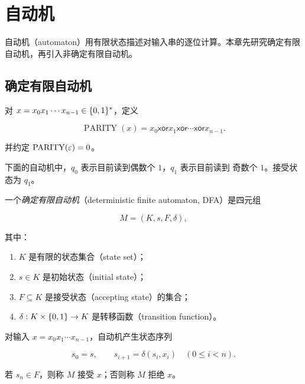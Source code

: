 \chapter{自动机}
\label{chap:automata}

自动机（automaton）用有限状态描述对输入串的逐位计算。本章先研究确定有限
自动机，再引入非确定有限自动机。

\section{确定有限自动机}

\begin{example}[奇偶校验]
  \label{ex:parity-dfa}
  对 $x=x_0x_1\cdots x_{n-1}\in\{0,1\}^{*}$，定义

  \[
    \operatorname{PARITY}(x)=x_0\mathbin{\mathsf{xor}}x_1
      \mathbin{\mathsf{xor}}\cdots\mathbin{\mathsf{xor}}x_{n-1}.
  \]

  并约定 $\operatorname{PARITY}(\varepsilon)=0$。

  下面的自动机中，$q_0$ 表示目前读到偶数个 $1$，$q_1$ 表示目前读到
  奇数个 $1$。接受状态为 $q_1$。

  \begin{center}
  \end{center}
\end{example}

\begin{definition}[确定有限自动机]
  \label{def:dfa}
  一个\emph{确定有限自动机}（deterministic finite automaton, DFA）是四元组

  \[
    M=(K,s,F,\delta),
  \]

  其中：

  \begin{enumerate}[label=\arabic*.]
    \item $K$ 是有限的状态集合（state set）；
    \item $s\in K$ 是初始状态（initial state）；
    \item $F\subseteq K$ 是接受状态（accepting state）的集合；
    \item $\delta:K\times\{0,1\}\to K$ 是转移函数（transition function）。
  \end{enumerate}

  对输入 $x=x_0x_1\cdots x_{n-1}$，自动机产生状态序列

  \[
    s_0=s,
    \qquad
    s_{i+1}=\delta(s_i,x_i)\quad(0\leq i<n).
  \]

  若 $s_n\in F$，则称 $M$ 接受 $x$；否则称 $M$ 拒绝 $x$。
\end{definition}

